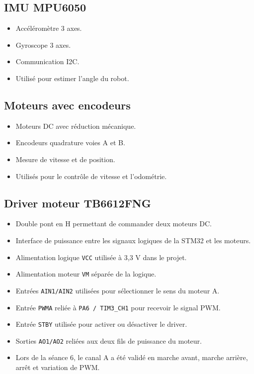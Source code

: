\documentclass[11pt,a4paper]{article}
\begin{document}
	\subsection*{IMU MPU6050}
	
	\begin{componentbox}
		\begin{itemize}
			\item Accéléromètre 3 axes.
			\item Gyroscope 3 axes.
			\item Communication I2C.
			\item Utilisé pour estimer l'angle du robot.
		\end{itemize}
	\end{componentbox}
	
	\subsection*{Moteurs avec encodeurs}
	
	\begin{componentbox}
		\begin{itemize}
			\item Moteurs DC avec réduction mécanique.
			\item Encodeurs quadrature voies A et B.
			\item Mesure de vitesse et de position.
			\item Utilisés pour le contrôle de vitesse et l'odométrie.
		\end{itemize}
	\end{componentbox}
	
	\subsection*{Driver moteur TB6612FNG}
	
	\begin{componentbox}
		\begin{itemize}
			\item Double pont en H permettant de commander deux moteurs DC.
			\item Interface de puissance entre les signaux logiques de la STM32 et les moteurs.
			\item Alimentation logique \texttt{VCC} utilisée à 3,3 V dans le projet.
			\item Alimentation moteur \texttt{VM} séparée de la logique.
			\item Entrées \texttt{AIN1/AIN2} utilisées pour sélectionner le sens du moteur A.
			\item Entrée \texttt{PWMA} reliée à \texttt{PA6 / TIM3\_CH1} pour recevoir le signal PWM.
			\item Entrée \texttt{STBY} utilisée pour activer ou désactiver le driver.
			\item Sorties \texttt{AO1/AO2} reliées aux deux fils de puissance du moteur.
			\item Lors de la séance 6, le canal A a été validé en marche avant, marche arrière, arrêt et variation de PWM.
		\end{itemize}
	\end{componentbox}
	
\end{document}
